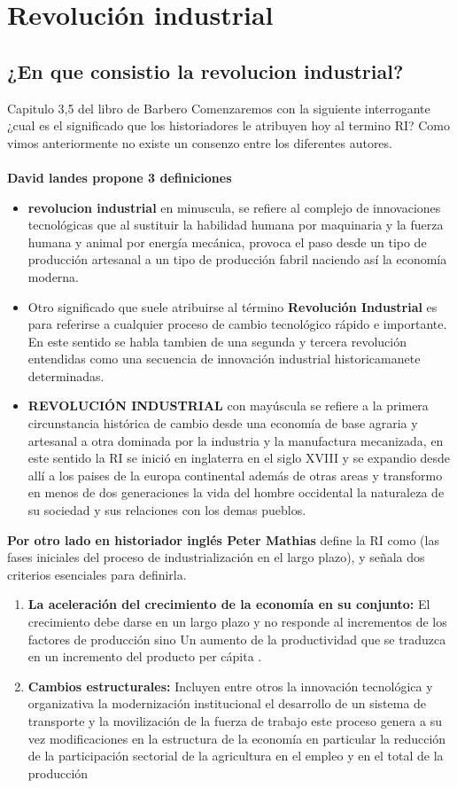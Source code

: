 \documentclass[12pt]{book}++
\begin{document}
\tableofcontents
\chapter{Revoluci\'on industrial}
\section{¿En que consistio la revolucion industrial?}
Capitulo 3,5 del libro de Barbero
 Comenzaremos con la siguiente interrogante ¿cual es el significado que los historiadores le atribuyen hoy al termino RI? Como vimos anteriormente no existe un consenzo entre los diferentes autores.
 \\
\\
\textbf{David landes propone 3 definiciones}
\begin{itemize}
 \item \textbf{revolucion industrial} en minuscula, se refiere al complejo de innovaciones tecnol\'ogicas que al sustituir la habilidad humana por maquinaria y la fuerza humana y animal por energ\'ia mec\'anica, provoca el paso desde un tipo de producci\'on artesanal a un tipo de producci\'on fabril naciendo as\'i la econom\'ia moderna.
 \item Otro significado que suele atribuirse al t\'ermino \textbf{Revoluci\'on Industrial}  es para referirse a cualquier proceso de cambio tecnol\'ogico r\'apido e importante.	En este sentido se habla tambien de una segunda y tercera revoluci\'on entendidas como una secuencia de innovaci\'on industrial historicamanete determinadas.
 \item \textbf{REVOLUCI\'ON INDUSTRIAL} con may\'uscula se refiere a la primera circunstancia hist\'orica de cambio desde una econom\'ia de base agraria y artesanal a otra dominada por la industria y la manufactura mecanizada, en este sentido la RI se inici\'o en inglaterra en el siglo XVIII y se expandio desde all\'i a los paises de la europa continental adem\'as de otras areas y transformo en menos de dos generaciones la vida del hombre occidental la naturaleza de su sociedad y sus relaciones con los demas pueblos.
 \end{itemize} 
\textbf{Por otro lado en historiador ingl\'es Peter Mathias} define la RI como (las fases iniciales del proceso de industrializaci\'on en el largo plazo), y señala dos criterios esenciales para definirla.
\begin{enumerate}
\item \textbf{La aceleraci\'on del crecimiento de la econom\'ia en su conjunto: }El crecimiento debe darse en un largo plazo y no responde al incrementos de los factores de producción sino Un aumento de la productividad que se traduzca en un incremento del producto per cápita .
\item \textbf{Cambios estructurales: }Incluyen entre otros la innovación tecnológica y organizativa la modernización institucional el desarrollo de un sistema de transporte y la movilización de la fuerza de trabajo este proceso genera a su vez modificaciones en la estructura de la economía en particular la reducción de la participación sectorial de la agricultura en el empleo y en el total de la producción
\end{enumerate}
\end{document}
